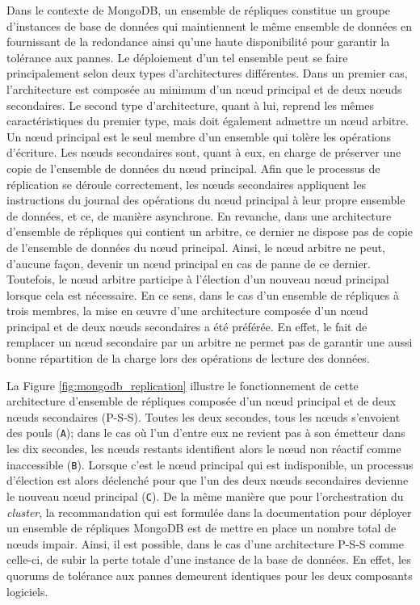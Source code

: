 Dans le contexte de MongoDB, un ensemble de répliques constitue un groupe d'instances de base de données qui maintiennent le même ensemble de données en fournissant de la redondance ainsi qu'une haute disponibilité pour garantir la tolérance aux pannes. Le déploiement d'un tel ensemble peut se faire principalement selon deux types d'architectures différentes. Dans un premier cas, l'architecture est composée au minimum d'un n\oe{}ud principal et de deux n\oe{}uds secondaires. Le second type d'architecture, quant à lui, reprend les mêmes caractéristiques du premier type, mais doit également admettre un n\oe{}ud arbitre. Un n\oe{}ud principal est le seul membre d'un ensemble qui tolère les opérations d'écriture. Les n\oe{}uds secondaires sont, quant à eux, en charge de préserver une copie de l'ensemble de données du n\oe{}ud principal. Afin que le processus de réplication se déroule correctement, les n\oe{}uds secondaires appliquent les instructions du journal des opérations du n\oe{}ud principal à leur propre ensemble de données, et ce, de manière asynchrone. En revanche, dans une architecture d'ensemble de répliques qui contient un arbitre, ce dernier ne dispose pas de copie de l'ensemble de données du n\oe{}ud principal. Ainsi, le n\oe{}ud arbitre ne peut, d'aucune façon, devenir un n\oe{}ud principal en cas de panne de ce dernier. Toutefois, le n\oe{}ud arbitre participe à l'élection d'un nouveau n\oe{}ud principal lorsque cela est nécessaire. En ce sens, dans le cas d'un ensemble de répliques à trois membres, la mise en \oe{}uvre d'une architecture composée d'un n\oe{}ud principal et de deux n\oe{}uds secondaires a été préférée. En effet, le fait de remplacer un n\oe{}ud secondaire par un arbitre ne permet pas de garantir une aussi bonne répartition de la charge lors des opérations de lecture des données.

La Figure \ref{fig:mongodb_replication} illustre le fonctionnement de cette architecture d'ensemble de répliques composée d'un n\oe{}ud principal et de deux n\oe{}uds secondaires (P-S-S). Toutes les deux secondes, tous les n\oe{}uds s'envoient des pouls (\texttt{A}); dans le cas où l'un d'entre eux ne revient pas à son émetteur dans les dix secondes, les n\oe{}uds restants identifient alors le n\oe{}ud non réactif comme inaccessible (\texttt{B}). Lorsque c'est le n\oe{}ud principal qui est indisponible, un processus d'élection est alors déclenché pour que l'un des deux n\oe{}uds secondaires devienne le nouveau n\oe{}ud principal (\texttt{C}). De la même manière que pour l'orchestration du \textit{cluster}, la recommandation qui est formulée dans la documentation pour déployer un ensemble de répliques MongoDB est de mettre en place un nombre total de n\oe{}uds impair. Ainsi, il est possible, dans le cas d'une architecture P-S-S comme celle-ci, de subir la perte totale d'une instance de la base de données. En effet, les quorums de tolérance aux pannes demeurent identiques pour les deux composants logiciels.

